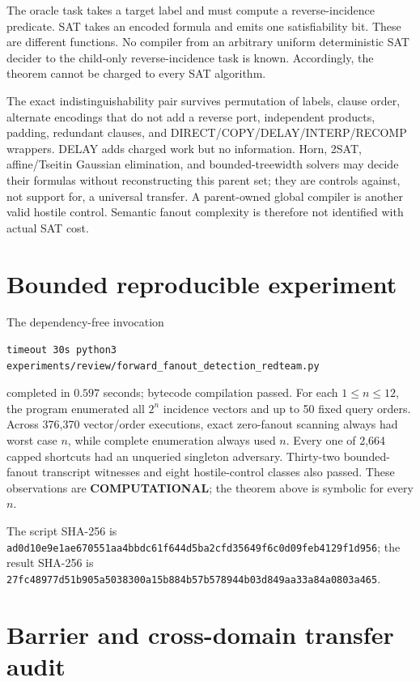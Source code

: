 \documentclass[11pt]{article}
\newcommand{\COMP}{\textbf{COMPUTATIONAL}}
\begin{document}
The oracle task takes a target label and must compute a reverse-incidence
predicate.  SAT takes an encoded formula and emits one satisfiability bit.
These are different functions.  No compiler from an arbitrary uniform
deterministic SAT decider to the child-only reverse-incidence task is known.
Accordingly, the theorem cannot be charged to every SAT algorithm.

The exact indistinguishability pair survives permutation of labels, clause
order, alternate encodings that do not add a reverse port, independent
products, padding, redundant clauses, and DIRECT/COPY/DELAY/INTERP/RECOMP
wrappers.  DELAY adds charged work but no information.  Horn, 2SAT,
affine/Tseitin Gaussian elimination, and bounded-treewidth solvers may decide
their formulas without reconstructing this parent set; they are controls
against, not support for, a universal transfer.  A parent-owned global
compiler is another valid hostile control.  Semantic fanout complexity is
therefore not identified with actual SAT cost.

\section{Bounded reproducible experiment}

The dependency-free invocation
\begin{verbatim}
timeout 30s python3 experiments/review/forward_fanout_detection_redteam.py
\end{verbatim}
completed in $0.597$ seconds; bytecode compilation passed.  For each
$1\le n\le12$, the program enumerated all $2^n$ incidence vectors and up to
50 fixed query orders.  Across 376,370 vector/order executions, exact
zero-fanout scanning always had worst case $n$, while complete enumeration
always used $n$.  Every one of 2,664 capped shortcuts had an unqueried
singleton adversary.  Thirty-two bounded-fanout transcript witnesses and
eight hostile-control classes also passed.  These observations are
\COMP; the theorem above is symbolic for every $n$.

The script SHA-256 is
\nolinkurl{ad0d10e9e1ae670551aa4bbdc61f644d5ba2cfd35649f6c0d09feb4129f1d956};
the result SHA-256 is
\nolinkurl{27fc48977d51b905a5038300a15b884b57b578944b03d849aa33a84a0803a465}.

\section{Barrier and cross-domain transfer audit}
\end{document}
